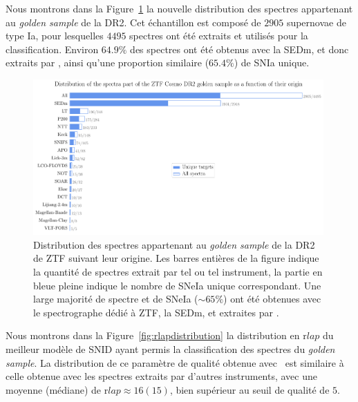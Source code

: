 \documentclass[../main/main.tex]{subfiles}
\begin{document}
Nous montrons dans la Figure~\ref{fig:specorigingoldendr2} la nouvelle
distribution des spectres appartenant au \textit{golden sample} de la
DR2. Cet échantillon est composé de $2905$ supernovae de type Ia, pour lesquelles
$4495$ spectres ont été extraits et utilisés pour la classification.
Environ $64.9\%$ des spectres ont été obtenus avec la SEDm, et donc
extraits par \hypergal, ainsi qu'une proportion similaire ($65.4\%$) de SNIa
unique. 

\begin{figure}[ht]
  \centering
  \includegraphics[width=0.99\textwidth]{../figures/09_dr2/spec_instorigin_golden_dr2.pdf}
  \caption[Distribution des spectres appartenant au \textit{golden sample} de la DR2 de ZTF suivant
  leur origine]{Distribution des spectres appartenant au \textit{golden
      sample} de la DR2 de ZTF
    suivant 
    leur origine. Les barres entières de la figure indique la quantité de
    spectres extrait par tel ou tel instrument, la partie en bleue pleine
    indique le nombre de SNeIa unique correspondant. Une large majorité
    de spectre et de SNeIa ($\sim65\%$) ont été obtenues avec le spectrographe dédié à
    ZTF, la SEDm, et extraites par \hypergal.}
  \label{fig:specorigingoldendr2}
\end{figure}


Nous montrons dans la Figure~\ref{fig:rlapdistribution} la distribution
en r$lap$ du meilleur modèle de SNID ayant permis la classification des
spectres du \textit{golden sample}. La distribution de ce paramètre de qualité obtenue avec
\hypergal\ est similaire à celle obtenue avec les spectres extraits par d'autres
instruments, avec une moyenne (médiane) de r$lap\approx16(15)$, bien
supérieur au seuil de qualité de $5$.
\end{document}

